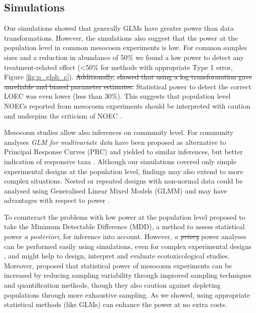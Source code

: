 \documentclass[twocolumn, natbib]{svjour3}
\providecommand{\DIFadd}[1]{{\protect\color{blue}\uwave{#1}}} %
\providecommand{\DIFdel}[1]{{\protect\color{red}\sout{#1}}}                      %
\providecommand{\DIFaddbegin}{} %
\providecommand{\DIFaddend}{} %
\providecommand{\DIFdelbegin}{} %
\providecommand{\DIFdelend}{} %
\begin{document}
\subsection{Simulations}
Our simulations showed that generally GLMs have greater power than data transformations.
However, the simulations also suggest that the power at the population level in common mesocosm experiments is low.
For common samples sizes and a reduction in abundance of 50\% we found a low power to detect any treatment-related effect (\textless 50\% for methods with appropriate Type 1 error, Figure \ref{fig:p_glob_c}).
\DIFdelbegin \DIFdel{Additionally, }%
\DIFdel{showed that using a log transformation gave unreliable and biased parameter estimates.
}\DIFdelend Statistical power to detect the correct LOEC was even lower (less than 30\%).
This suggests that population level NOECs reported from mesocosm experiments should be interpreted with caution and underpins the criticism of NOEC \citep{laskowski_good_1995,landis_well_2011}.

Mesocosm studies allow also inferences on community level. 
For community analyses \emph{GLM for multivariate data} \DIFaddbegin \citep{warton_distance-based_2012} \DIFaddend have been proposed as alternative to Principal Response Curves (PRC) and yielded to similar inferences, but better indication of responsive taxa \DIFdelbegin %
\DIFdelend \DIFaddbegin \citep{szocs_analysing_2015}\DIFaddend . 
Although our simulations covered only simple experimental designs at the population level, findings may also extend to more complex situations. 
Nested or repeated designs with non-normal data could be analysed using Generalised Linear Mixed Models (GLMM) and may have advantages with respect to power \citep{stroup_rethinking_2014}.

To counteract the problems with low power at the population level \citet{brock_minimum_2015} proposed to take the Minimum Detectable Difference (MDD), a method to assess statistical power \emph{a posteriori}, for inference into account.
However, \emph{a \DIFdelbegin \DIFdel{priory}\DIFdelend \DIFaddbegin \DIFadd{priori}\DIFaddend } power analyses can be performed easily using simulations, even for complex experimental designs \citep{johnson_power_2014}, and might help to design, interpret and evaluate ecotoxicological studies.
Moreover, \citet{brock_minimum_2015} proposed that statistical power of mesocosm experiments can be increased by reducing sampling variability through improved sampling techniques and quantification methods, though they also caution against depleting populations through more exhaustive sampling.
As we showed, using appropriate statistical methods (like GLMs) can enhance the power at no extra costs.
\end{document}
